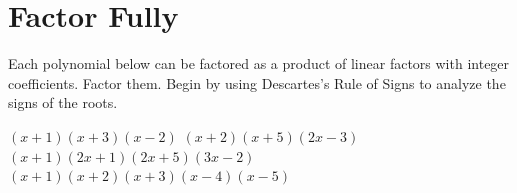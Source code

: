 \section*{Factor Fully}
Each polynomial below can be factored as a product of linear factors with integer coefficients. Factor them. Begin by using Descartes's Rule of Signs to analyze the signs of the roots.
\begin{smenum}
\mitemxx
{$(x+1)(x+3)(x-2)$}
{$(x+2)(x+5)(2x-3)$}
\mitemxx
{$(x+1)(2x+1)(2x+5)(3x-2)$}
{$(x+1)(x+2)(x+3)(x-4)(x-5)$}
\end{smenum}

